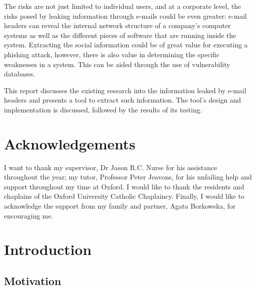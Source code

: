 \documentclass[a4paper,DIV=12,BCOR=7mm,abstract=yes,twoside,11pt]{scrreprt}
\begin{document}
The risks are not just limited to individual users, and at a corporate
level, the risks posed by leaking information through e-mails could be even
greater: e-mail headers can reveal the internal network structure of a
company's computer systems as well as the different pieces of software that
are running inside the system.  Extracting the social information could be
of great value for executing a phishing attack, however, there is also value
in determining the specific weaknesses in a system.  This can be aided
through the use of vulnerability databases.

This report discusses the existing research into the information leaked by
e-mail headers and presents a tool to extract such information.  The tool's
design and implementation is discussed, followed by the results of its testing.

\cleardoublepage 
\chapter*{Acknowledgements}

I want to thank my supervisor, Dr Jason R.C. Nurse for his assistance
throughout the year; my tutor, Professor Peter Jeavons, for his unfailing
help and support throughout my time at Oxford.  I would like to thank the
residents and chaplains of the Oxford University Catholic Chaplaincy.
Finally, I would like to acknowledge the support from my family and
partner, Agata Borkowska, for encouraging me.

\cleardoublepage 
\tableofcontents 
\clearpage
\let\LaTeXStandardClearpage\clearpage
\let\clearpage\relax  %

\listoftables \listoffigures \listofalgorithms

\let\clearpage\LaTeXStandardClearpage %


\cleardoublepage 
\chapter{Introduction}\label{chap:int}
\setcounter{page}{1}

\section{Motivation}
\end{document}
